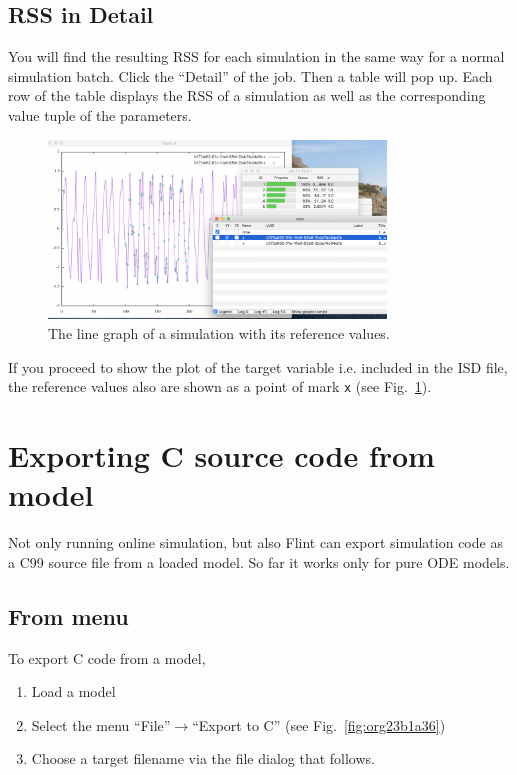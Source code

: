 \documentclass[a4paper,10pt]{report}
\begin{document}
\subsection{RSS in Detail}
\label{sec:org623a9a5}
You will find the resulting RSS for each simulation in the same way for a normal
simulation batch. Click the ``Detail'' of the job. Then a table will pop up.
Each row of the table displays the RSS of a simulation as well as the
corresponding value tuple of the parameters.

\begin{figure}[htbp]
\centering
\includegraphics[width=0.8\textwidth]{image/parameter-fitting-plot.png}
\caption{\label{fig:orga82bf3c}The line graph of a simulation with its reference values.}
\end{figure}

If you proceed to show the plot of the target variable i.e. included in the ISD
file, the reference values also are shown as a point of mark \texttt{x} (see
Fig.~\ref{fig:orga82bf3c}).

\section{Exporting C source code from model}
\label{sec:orgd49ba4f}
Not only running online simulation, but also Flint can export simulation code
as a C99 source file from a loaded model. So far it works only for pure ODE models.

\subsection{From menu}
\label{sec:org63448ab}
To export C code from a model,

\begin{enumerate}
\item Load a model
\item Select the menu ``File''\(\to\)``Export to C'' (see Fig.~\ref{fig:org23b1a36})
\item Choose a target filename via the file dialog that follows.
\end{enumerate}
\end{document}
